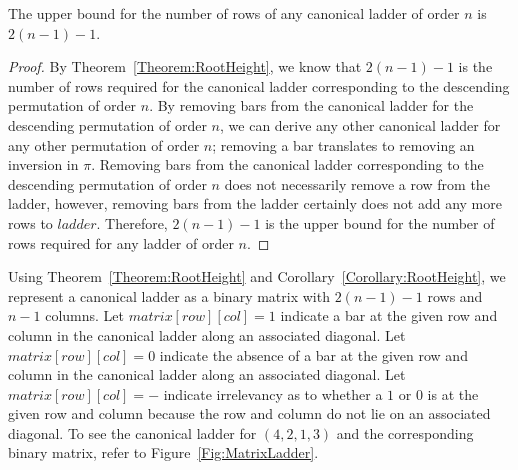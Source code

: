  \begin{corollary}
     The upper bound for the number of rows of any canonical ladder of order $n$ is $2(n-1)-1$.
     \label{Corollary:RootHeight}
 \end{corollary}
 \begin{proof}
     By Theorem~\ref{Theorem:RootHeight}, we know that $2(n-1)-1$ is the number of rows required for 
     the canonical ladder corresponding 
     to the descending permutation of order $n$. By removing 
     bars from the canonical ladder for the descending permutation of order $n$, we can derive any other canonical ladder for any other permutation 
     of order $n$; removing a bar translates to removing an 
     inversion in $\pi$. Removing bars from the canonical ladder corresponding to the descending permutation of order $n$ 
     does not necessarily remove a row from the ladder, however, removing bars from the ladder certainly does not add any more rows 
     to $ladder$. Therefore, $2(n-1)-1$ is the upper bound for the number of rows required for any ladder of order $n$.
 \end{proof}
Using Theorem~\ref{Theorem:RootHeight} and Corollary~\ref{Corollary:RootHeight}, 
we represent a canonical ladder as a binary matrix with $2(n-1)-1$ rows and $n-1$ columns. Let $matrix[row][col]=1$ 
indicate a bar at the given row and column in the canonical ladder along an associated diagonal. Let $matrix[row][col]=0$ indicate the absence 
of a bar at the given row and column in the canonical ladder along an associated diagonal. Let $matrix[row][col]=-$ indicate irrelevancy as to whether 
a $1$ or $0$ is at the given row and column because the row and column do not lie on an associated diagonal. To see the canonical ladder for 
$(4,2,1,3)$ and the corresponding binary matrix, refer to Figure~\ref{Fig:MatrixLadder}.
